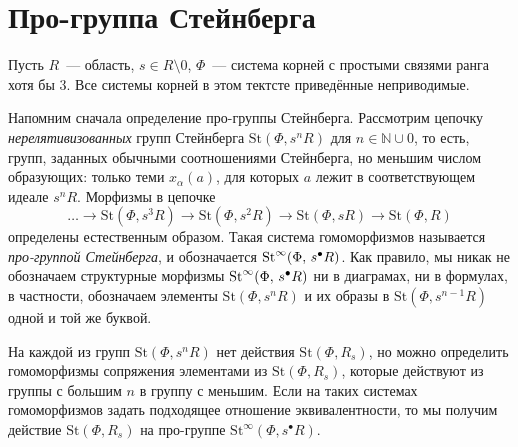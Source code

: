 \documentclass[12pt,a4paper]{article}
\begin{document}


\newcommand{\Set}{\mathbf{Set}}
\newcommand{\Group}{\mathbf{Grp}}
\newcommand{\Rng}{\mathbf{Rng}}
\newcommand{\Fun}{\mathbf{Fun}}
\newcommand{\Mod}{\mathbf{Mod}}
\newcommand{\op}{\mathrm{op}}
\newcommand{\ZZ}{\mathbb{Z}}

\newcommand{\otimeshat}{\mathbin{\widehat{\otimes}}}

\newcommand{\up}[2]{{^{#1}\!{#2}}}

\newcommand{\rA}{\mathsf{A}}
\newcommand{\rB}{\mathsf{B}}
\newcommand{\rC}{\mathsf{C}}
\newcommand{\rD}{\mathsf{D}}
\newcommand{\rE}{\mathsf{E}}
\newcommand{\rF}{\mathsf{F}}
\newcommand{\rG}{\mathsf{G}}

\section{Про-группа Стейнберга}

Пусть $R$~--- область, $s\in R\setminus0$, $\Phi$~--- система корней с простыми связями ранга хотя бы $3$. Все системы корней в этом тектсте приведённые неприводимые.

Напомним сначала определение про-группы Стейнберга. Рассмотрим цепочку {\it нерелятивизованных} групп Стейнберга $\mathrm{St}(\Phi, s^nR)$ для $n\in\mathbb N\cup0$, то есть, групп, заданных обычными соотношениями Стейнберга, но меньшим числом образующих: только теми $x_{\alpha}(a)$, для которых $a$ лежит в соответствующем идеале $s^nR$. Морфизмы в цепочке
$$
\ldots\rightarrow\mathrm{St}(\Phi, s^3R)\rightarrow\mathrm{St}(\Phi, s^2R)\rightarrow\mathrm{St}(\Phi, sR)\rightarrow\mathrm{St}(\Phi, R)
$$
определены естественным образом. Такая система гомоморфизмов называется {\it про-группой Стейнберга}, и обозначается $\mathop{\mathrm{St}}\nolimits^\infty(\Phi,\,s^\bullet R)$. Как правило, мы никак не обозначаем структурные морфизмы $\mathop{\mathrm{St}}\nolimits^\infty(\Phi,\,s^\bullet R)$ ни в диаграмах, ни в формулах, в частности, обозначаем элементы $\mathrm{St}(\Phi, s^nR)$ и их образы в $\mathrm{St}(\Phi, s^{n-1}R)$ одной и той же буквой.

На каждой из групп $\mathrm{St}(\Phi, s^nR)$ нет действия $\mathrm{St}(\Phi, R_s)$, но можно определить гомоморфизмы сопряжения элементами из $\mathrm{St}(\Phi, R_s)$, которые действуют из группы с большим $n$ в группу с меньшим. Если на таких системах гомоморфизмов задать подходящее отношение эквивалентности, то мы получим действие $\mathrm{St}(\Phi, R_s)$ на про-группе $\mathrm{St}^\infty(\Phi, s^\bullet R)$.
\end{document}
